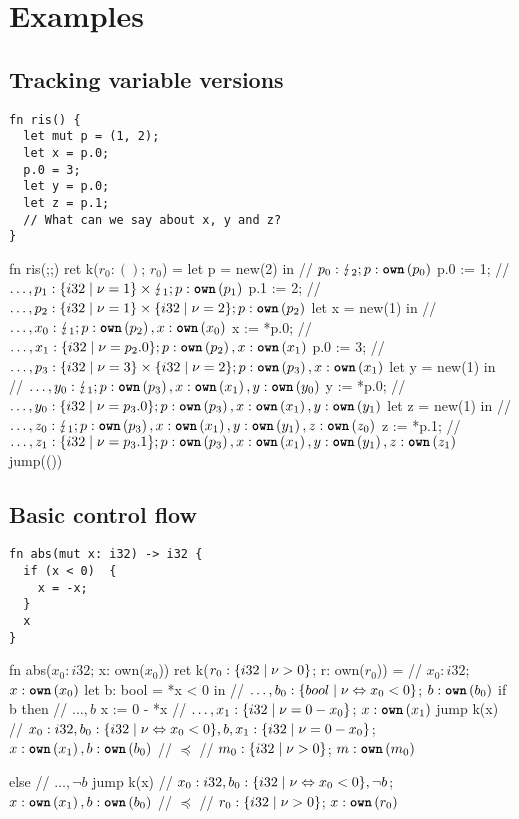\documentclass{article}
\begin{document}
\newpage

\section{Examples}

\subsection{Tracking variable versions}
\begin{verbatim}
fn ris() {
  let mut p = (1, 2);
  let x = p.0;
  p.0 = 3;
  let y = p.0;
  let z = p.1;
  // What can we say about x, y and z?
}
\end{verbatim}

\begin{lambdalr}
fn ris(;;) ret k($r_0: ()$; $r_0$) =
  let p = new(2) in   // $p_0: \lightning_2; p: \text{\ttfamily \bfseries own}\left(p_0\right)$
  p.0 := 1;           // $\dots, p_1: \r{i32 | \nu = 1} \times \lightning_1; p: \own{p_1}$
  p.1 := 2;           // $\dots, p_2: \r{i32 | \nu = 1} \times \r{i32 | \nu = 2}; p: \own{p_2}$
  let x = new(1) in   // $\dots, x_0: \lightning_1; p: \text{\ttfamily \bfseries own}\left(p_2\right), x: \text{\ttfamily \bfseries own}\left(x_0\right)$
  x := *p.0;          // $\dots, x_1: \r{i32 | \nu = p_2.0}; p: \own{p_2}, x: \own{x_1}$
  p.0 := 3;           // $\dots, p_3: \r{i32 | \nu = 3} \times \r{i32 | \nu = 2}; p: \own{p_3}, x:\own{x_1}$
  let y = new(1) in   // $\dots, y_0: \lightning_1; p: \text{\ttfamily \bfseries own}\left(p_3\right), x:\text{\ttfamily \bfseries own}\left(x_1\right), y: \text{\ttfamily \bfseries own}\left(y_0\right)$
  y := *p.0;          // $\dots, y_0: \r{i32 | \nu = p_3.0}; p: \own{p_3}, x:\own{x_1}, y: \own{y_1}$
  let z = new(1) in   // $\dots, z_0: \lightning_1; p: \text{\ttfamily \bfseries own}\left(p_3\right), x:\text{\ttfamily \bfseries own}\left(x_1\right), y:\text{\ttfamily \bfseries own}\left(y_1\right), z:\text{\ttfamily \bfseries own}\left(z_0\right)$
  z := *p.1;          // $\dots, z_1: \r{i32 | \nu = p_3.1}; p:\own{p_3}, x:\own{x_1}, y:\own{y_1}, z:\own{z_1}$
  jump(())
\end{lambdalr}

\subsection{Basic control flow}

\begin{verbatim}
fn abs(mut x: i32) -> i32 {
  if (x < 0)  {
    x = -x;
  }
  x
}
\end{verbatim}

\begin{lambdalr}
fn abs($x_0: i32$; x: own($x_0$)) ret k($r_0:\r{i32|\nu > 0}$; r: own($r_0$)) =
  // $x_0: i32$; $x: \text{\ttfamily \bfseries own}\left(x_0\right)$
  let b: bool = *x < 0 in  // $\dots, b_0:\r{bool | \nu \Leftrightarrow x_0 < 0}$; $b:\text{\ttfamily \bfseries own}\left(b_0\right)$
  if b then                // $\dots, b$
    x := 0 - *x            // $\dots, x_1: \r{i32 | \nu = 0 - x_0}$; $x: \text{\ttfamily \bfseries own}\left(x_1\right)$
    jump k(x)
      // $x_0: i32, b_0:\r{i32 | \nu \Leftrightarrow x_0 < 0}, b, x_1:\r{i32 | \nu = 0-x_0}$; $x:\text{\ttfamily \bfseries own}\left(x_1\right), b:\text{\ttfamily \bfseries own}\left(b_0\right)$
      // $\preceq$
      // $m_0:\r{i32 | \nu > 0}$; $m:\text{\ttfamily \bfseries own}\left(m_0\right)$

  else  // $\dots, \neg b$
    jump k(x)
      // $x_0: i32, b_0:\r{i32 | \nu \Leftrightarrow x_0 < 0}, \neg b$; $x:\text{\ttfamily \bfseries own}\left(x_1\right), b:\text{\ttfamily \bfseries own}\left(b_0\right)$
      // $\preceq$
      // $r_0:\r{i32 | \nu > 0}$; $x:\text{\ttfamily \bfseries own}\left(r_0\right)$
\end{lambdalr}
\end{document}
